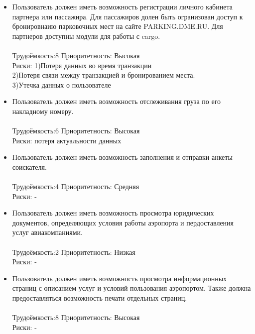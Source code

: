 \begin{enumerate}
\begin{itemize}
                  \\
            \item Пользователь должен иметь возможность
                  регистрации личного кабинета партнера или
                  пассажира. Для пассажиров долен быть
                  огранизован доступ к бронировнаию парковочных
                  мест на сайте PARKING.DME.RU. Для партнеров
                  доступны модули для работы с cargo.
                  \\\\
                  Трудоёмкость:8    Приоритетность: Высокая \\Риски: 1)Потеря данных во время транзакции\\2)Потеря связи между транзакцией и бронированием места.\\3)Утечка данных о пользователе
                  \\
            \item Пользователь должен иметь возможность
                  отслеживания груза по его накладному номеру.
                  \\\\
                  Трудоёмкость:6    Приоритетность: Высокая \\Риски: потеря актуальности данных
                  \\
            \item Пользователь должен иметь возможность
                  заполнения и отправки анкеты соискателя.
                  \\\\
                  Трудоёмкость:4    Приоритетность: Средняя \\Риски: -
                  \\
            \item Пользователь должен иметь возможность
                  просмотра юридических документов, определяющих
                  условия работы аэропорта и пердоставления
                  услуг авиакомпаниями.
                  \\\\
                  Трудоёмкость:2    Приоритетность: Низкая \\Риски: -
                  \\
            \item Пользователь должен иметь возможность просмотра
                  информационных страниц с описанием услуг и
                  условий пользования аэропортом. Также должна
                  предоставляться возможность печати отдельных
                  страниц.
                  \\\\
                  Трудоёмкость:8    Приоритетность: Высокая \\Риски: -
      \end{itemize}
\end{enumerate}
